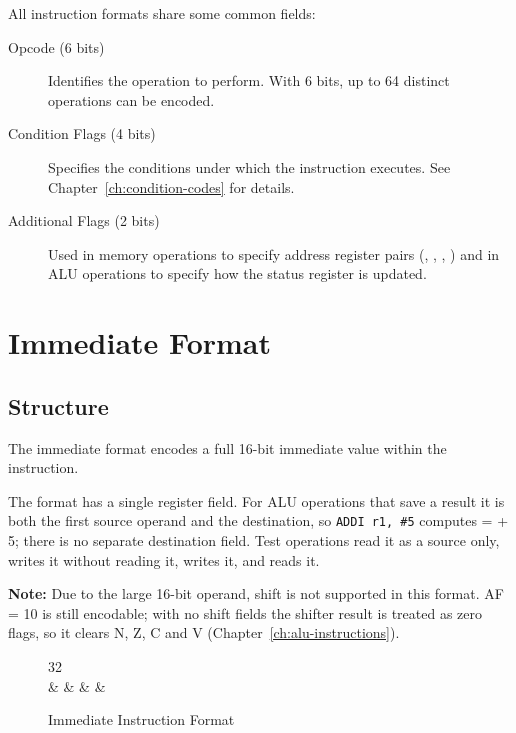 All instruction formats share some common fields:

\begin{description}
	\item[Opcode (6 bits)] Identifies the operation to perform. With 6 bits, up to 64 distinct operations can be encoded.

	\item[Condition Flags (4 bits)] Specifies the conditions under which the instruction executes. See
	      Chapter~\ref{ch:condition-codes} for details.

	\item[Additional Flags (2 bits)] Used in memory operations to specify address register pairs (, , ,
	      ) and in ALU operations to specify how the status register is updated.

\end{description}

\section{Immediate Format}

\subsection{Structure}

The immediate format encodes a full 16-bit immediate value within the instruction.

The format has a single register field. For ALU operations that save a result it is both the first source operand and
the destination, so \texttt{ADDI r1, \#5} computes  =  + 5; there is no separate destination field.
Test operations read it as a source only,  writes it without reading it,  writes it, and
 reads it.

\textbf{Note:} Due to the large 16-bit operand, shift is not supported in this format. AF = 10 is still encodable; with no shift fields the shifter result is treated as zero flags, so it clears N, Z, C and V (Chapter~\ref{ch:alu-instructions}).

\begin{figure}[H]
	\centering
	\begin{bytefield}[bitwidth=1.3em]{32}
		 \\
		 &
		 &
		 &
		 &
	\end{bytefield}
	\caption{Immediate Instruction Format}
	\label{fig:immediate-format}
\end{figure}

